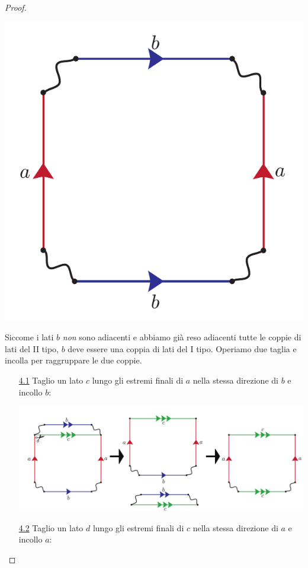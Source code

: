 \begin{proof}{}
\begin{center}
	\includegraphics[trim=0cm 0cm 0cm 0cm, clip, scale=0.35]{images/cutandpastealgorithmstep4-2.pdf}
\end{center}
Siccome i lati $b$ \textit{non} sono adiacenti e abbiamo già reso adiacenti tutte le coppie di lati del II tipo, $b$ deve essere una coppia di lati del I tipo.
Operiamo due taglia e incolla per raggruppare le due coppie.
\begin{enumerate}
	\item[\underline{4.1}] Taglio un lato $c$ lungo gli estremi finali di $a$ nella stessa direzione di $b$ e incollo $b$:
	\begin{center}
		\includegraphics[trim=0cm 0cm 0cm 0cm, clip, scale=0.35]{images/cutandpastealgorithmstep4-3.pdf}
	\end{center}
	\item[\underline{4.2}] Taglio un lato $d$ lungo gli estremi finali di $c$ nella stessa direzione di $a$ e incollo $a$:

\end{enumerate}
\end{proof}
